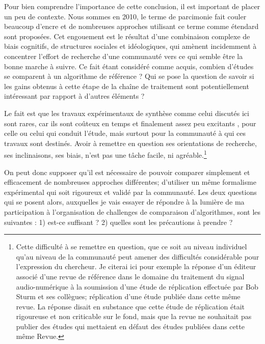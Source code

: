 
Pour bien comprendre l'importance de cette conclusion, il est important de placer un peu de contexte. Nous sommes en 2010, le terme de parcimonie fait couler beaucoup d'encre et de nombreuses approches utilisant ce terme comme étendard sont proposées. Cet engouement est le résultat d'une combinaison complexe de biais cognitifs, de structures sociales et idéologiques, qui amènent incidemment à concentrer l'effort de recherche d'une communauté vers ce qui semble être la bonne marche à suivre. Ce fait étant considéré comme acquis, combien d'études se comparent à un algorithme de référence ? Qui se pose la question de savoir si les gains obtenus à cette étape de la chaîne de traitement sont potentiellement intéressant par rapport à d'autres éléments ?

Le fait est que les travaux expérimentaux de synthèse comme celui discutés ici sont rares, car ils sont coûteux en temps et finalement assez peu \og excitants \fg, pour celle ou celui qui conduit l'étude, mais surtout pour la communauté à qui ces travaux sont destinés. Avoir à remettre en question ses orientations de recherche, ses inclinaisons, ses biais, n'est pas une tâche facile, ni agréable.\footnote{Cette difficulté à se remettre en question, que ce soit au niveau individuel qu'au niveau de la communauté peut amener des difficultés considérable pour l'expression du chercheur. Je citerai ici pour exemple la réponse d'un éditeur associé d'une revue de référence dans le domaine du traitement du signal audio-numérique à la soumission d'une étude de réplication effectuée par Bob Sturm et ses collègues; réplication d'une étude publiée dans cette même revue. La réponse disait en substance que cette étude de réplication était rigoureuse et non criticable sur le fond, mais que la revue ne souhaitait pas publier des études qui mettaient en défaut des études publiées dans cette même Revue.}

On peut donc supposer qu'il est nécessaire de pouvoir comparer simplement et efficacement de nombreuses approches différentes; d'utiliser un même formalisme expérimental qui soit rigoureux et validé par la communauté. Les deux questions qui se posent alors, auxquelles je vais essayer de répondre à la lumière de ma participation à l'organisation de challenges de comparaison d'algorithmes, sont les suivantes : 1) est-ce suffisant ? 2) quelles sont les précautions à prendre ?

